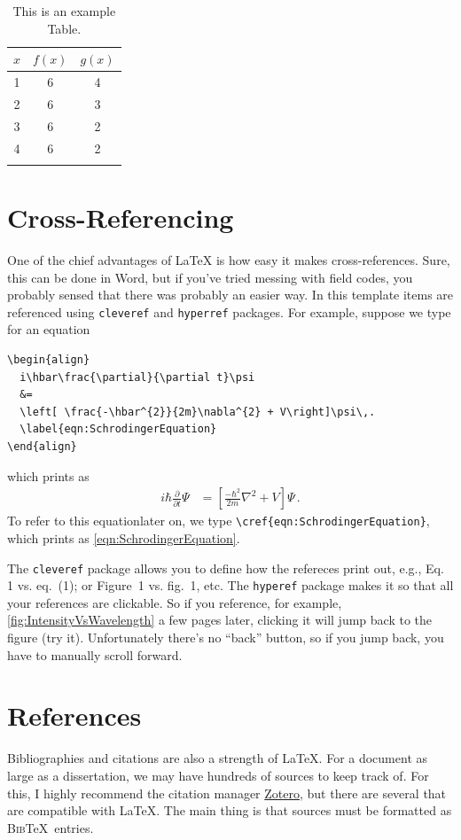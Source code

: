 \begin{table}
\caption{This is an example Table.}
  \begin{center}
  \begin{tabular}{ccc}
    $x$ & $f(x)$ & $g(x)$ \\
    \hline
    1 & 6 & 4  \\
    2 & 6 & 3  \\
    3 & 6 & 2  \\
    4 & 6 & 2  \\
    \label{tab:ValuesOfFunctions}
  \end{tabular}
  \end{center}
\end{table}

\section{Cross-Referencing}
One of the chief advantages of \LaTeX{} is how easy it makes cross-references.
Sure, this can be done in Word, but if you've tried messing with field codes, you probably sensed that there was probably an easier way.
In this template items are referenced using \texttt{cleveref} and \texttt{hyperref} packages.
For example, suppose we type for an equation
{\small
\begin{verbatim}
\begin{align}
  i\hbar\frac{\partial}{\partial t}\psi 
  &=
  \left[ \frac{-\hbar^{2}}{2m}\nabla^{2} + V\right]\psi\,.
  \label{eqn:SchrodingerEquation}
\end{align}
\end{verbatim}
}%
which prints as
\begin{align}
  i\hbar\frac{\partial}{\partial t}\Psi &= \left[ \frac{-\hbar^{2}}{2m}\nabla^{2} + V\right]\Psi\,.
  \label{eqn:SchrodingerEquation}
\end{align}
To refer to this equationlater on, we type \verb|\cref{eqn:SchrodingerEquation}|, which prints as \cref{eqn:SchrodingerEquation}.

The \texttt{cleveref} package allows you to define how the refereces print out, e.g., Eq. 1 vs. eq.~(1); or Figure~1 vs. fig.~1, etc.
The \texttt{hyperef} package makes it so that all your references are clickable. 
So if you reference, for example, \cref{fig:IntensityVsWavelength} a few pages later, clicking it will jump back to the figure (try it).
Unfortunately there's no ``back'' button, so if you jump back, you have to manually scroll forward.

\section{References}
Bibliographies and citations are also a strength of \LaTeX{}. 
For a document as large as a dissertation, we may have hundreds of sources to keep track of. 
For this, I highly recommend the citation manager \href{https://www.zotero.org/}{Zotero}, but there are several that are compatible with \LaTeX{}.
The main thing is that sources must be formatted as \textsc{Bib}\TeX\ entries. \\

